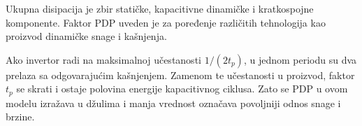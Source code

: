 Ukupna disipacija je zbir statičke, kapacitivne dinamičke i kratkospojne komponente. Faktor PDP uveden je za poređenje različitih tehnologija kao proizvod dinamičke snage i kašnjenja.

Ako invertor radi na maksimalnoj učestanosti $1/(2t_p)$, u jednom periodu su dva prelaza sa odgovarajućim kašnjenjem. Zamenom te učestanosti u proizvod, faktor $t_p$ se skrati i ostaje polovina energije kapacitivnog ciklusa. Zato se PDP u ovom modelu izražava u džulima i manja vrednost označava povoljniji odnos snage i brzine.
